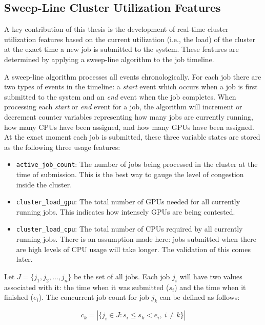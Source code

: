 \subsection{Sweep-Line Cluster Utilization Features}
\label{sec:sweepline}

A key contribution of this thesis is the development of real-time cluster utilization features based on the current utilization (i.e., the load) of the cluster at the exact time a new job is submitted to the system. These features are determined by applying a sweep-line algorithm to the job timeline.

A sweep-line algorithm processes all events chronologically. For each job there are two types of events in the timeline: a \textit{start} event which occurs when a job is first submitted to the system and an \textit{end} event when the job completes. When processing each \textit{start} or \textit{end} event for a job, the algorithm will increment or decrement counter variables representing how many jobs are currently running, how many CPUs have been assigned, and how many GPUs have been assigned. At the exact moment each job is submitted, these three variable states are stored as the following three usage features:

\begin{itemize}
    \item \texttt{active\_job\_count}: The number of jobs being processed in the cluster at the time of submission. This is the best way to gauge the level of congestion inside the cluster.
    \item \texttt{cluster\_load\_gpu}: The total number of GPUs needed for all currently running jobs. This indicates how intensely GPUs are being contested.
    \item \texttt{cluster\_load\_cpu}: The total number of CPUs required by all currently running jobs. There is an assumption made here: jobs submitted when there are high levels of CPU usage will take longer. The validation of this comes later.
\end{itemize}

Let $J = \{j_1, j_2, \ldots, j_n\}$ be the set of all jobs. Each job $j_i$ will have two values associated with it: the time when it was submitted ($s_i$) and the time when it finished ($e_i$). The concurrent job count for job $j_k$ can be defined as follows:

\begin{equation}
    c_k = \left| \{ j_i \in J : s_i \leq s_k < e_i,\ i \neq k \} \right|
\end{equation}

